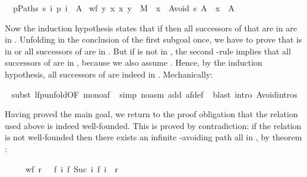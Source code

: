 \begin{isabellebody}
\begin{isamarkuptxt}
\begin{isabelle}
\ {}{\isachardot}\ {\isasymforall}p{\isasymin}Paths\ s{\isachardot}\ {\isasymexists}i{\isachardot}\ p\ i\ {\isasymin}\ A\ {\isasymLongrightarrow}\isanewline
{}wf\ {\isacharbraceleft}{\isacharparenleft}y{\isacharcomma}\ x{\isacharparenright}{\isachardot}\ {\isacharparenleft}x{\isacharcomma}\ y{\isacharparenright}\ {\isasymin}\ M\ {\isasymand}\ x\ {\isasymin}\ Avoid\ s\ A\ {\isasymand}\ x\ {\isasymnotin}\ A{\isacharbraceright}%
\end{isabelle}
Now the induction hypothesis states that if 
then all successors of  that are in  are in
. Unfolding  in the conclusion of the first
subgoal once, we have to prove that  is in  or all successors
of  are in .  But if  is not in ,
the second 
-rule implies that all successors of  are in
, because we also assume .
Hence, by the induction hypothesis, all successors of  are indeed in
. Mechanically:%
\end{isamarkuptxt}%
\isamarkuptrue%
\ \isamarkupfalse%
{\isacharparenleft}subst\ lfp{\isacharunderscore}unfold{\isacharbrackleft}OF\ mono{\isacharunderscore}af{\isacharbrackright}{\isacharparenright}\isanewline
\ \isamarkupfalse%
{\isacharparenleft}simp\ {\isacharparenleft}no{\isacharunderscore}asm{\isacharparenright}\ add{\isacharcolon}\ af{\isacharunderscore}def{\isacharparenright}\isanewline
\ \isamarkupfalse%
{\isacharparenleft}blast\ intro{\isacharcolon}\ Avoid{\isachardot}intros{\isacharparenright}%
\begin{isamarkuptxt}%
Having proved the main goal, we return to the proof obligation that the 
relation used above is indeed well-founded. This is proved by contradiction: if
the relation is not well-founded then there exists an infinite -avoiding path all in , by theorem
:
\begin{isabelle}%
\ \ \ \ \ wf\ r\ {\isacharequal}\ {\isacharparenleft}{\isasymnot}\ {\isacharparenleft}{\isasymexists}f{\isachardot}\ {\isasymforall}i{\isachardot}\ {\isacharparenleft}f\ {\isacharparenleft}Suc\ i{\isacharparenright}{\isacharcomma}\ f\ i{\isacharparenright}\ {\isasymin}\ r{\isacharparenright}{\isacharparenright}%

\end{isabelle}
\end{isamarkuptxt}
\end{isabellebody}
